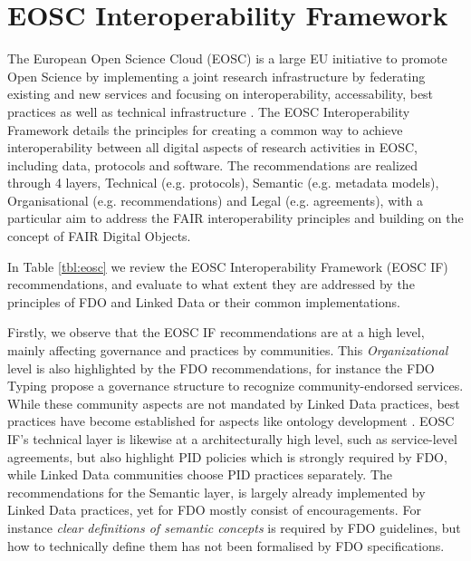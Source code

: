 \documentclass[fleqn,10pt,NOlineno]{wlpeerjlua}
\begin{document}



\section*{EOSC Interoperability Framework}\label{sec:eosc-interoperability-framework}

The European Open Science Cloud (EOSC) is a large EU initiative to promote Open Science by implementing a joint research infrastructure by federating existing and new services and focusing on interoperability, accessability, best practices as well as technical infrastructure \autocite{10.2777/940154}. The EOSC Interoperability Framework \autocite{corchoEOSCInteroperabilityFramework2021b} details the principles for creating a common way to achieve interoperability between all digital aspects of research activities in EOSC, including data, protocols and software. The recommendations are realized through 4 layers, Technical (e.g. protocols), Semantic (e.g. metadata models), Organisational (e.g. recommendations) and Legal (e.g. agreements), with a particular aim to address the FAIR interoperability principles and building on the concept of FAIR Digital Objects. 

In Table \vref{tbl:eosc} we review the EOSC Interoperability Framework (EOSC IF) recommendations, and evaluate to what extent they are addressed by the principles of FDO and Linked Data or their common implementations.

Firstly, we observe that the EOSC IF recommendations are at a high level, mainly affecting governance and practices by communities. This \emph{Organizational} level is also highlighted by the FDO recommendations, for instance the FDO Typing \autocite{fdo-TypingFDOs} propose a governance structure to recognize community-endorsed services. While these community aspects are not mandated by Linked Data practices, best practices have become established for aspects like ontology development \autocite{10.1186/s13326-021-00240-6}. EOSC IF's technical layer is likewise at a architecturally high level, such as service-level agreements, but also highlight PID policies which is strongly required by FDO, while Linked Data communities choose PID practices separately. The recommendations for the Semantic layer, is largely already implemented by Linked Data practices, yet for FDO mostly consist of encouragements. For instance \emph{clear definitions of semantic concepts} is required by FDO guidelines, but how to technically define them has not been formalised by FDO specifications. 
\end{document}
